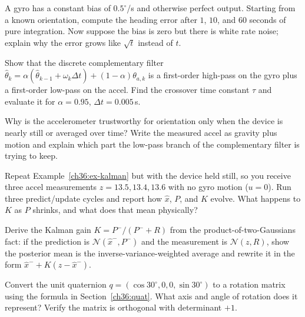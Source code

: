 \begin{exercise}
A gyro has a constant bias of $0.5^\circ$/s and otherwise perfect output. Starting from a
known orientation, compute the heading error after $1$, $10$, and $60$ seconds of pure
integration. Now suppose the bias is zero but there is white rate noise; explain why the
error grows like $\sqrt{t}$ instead of $t$.
\end{exercise}

\begin{exercise}
Show that the discrete complementary filter
$\hat\theta_k = \alpha(\hat\theta_{k-1}+\omega_k\Delta t) + (1-\alpha)\theta_{a,k}$ is a
first-order high-pass on the gyro plus a first-order low-pass on the accel. Find the
crossover time constant $\tau$ and evaluate it for $\alpha=0.95$, $\Delta t=0.005$\,s.
\end{exercise}

\begin{exercise}
Why is the accelerometer trustworthy for orientation only when the device is nearly
still or averaged over time? Write the measured accel as gravity plus motion and explain
which part the low-pass branch of the complementary filter is trying to keep.
\end{exercise}

\begin{exercise}
Repeat Example~\ref{ch36:ex-kalman} but with the device held still, so you receive three
accel measurements $z = 13.5, 13.4, 13.6$ with no gyro motion ($u=0$). Run three
predict/update cycles and report how $\hat x$, $P$, and $K$ evolve. What happens to $K$
as $P$ shrinks, and what does that mean physically?
\end{exercise}

\begin{exercise}
Derive the Kalman gain $K=P^-/(P^-+R)$ from the product-of-two-Gaussians fact: if the
prediction is $\mathcal N(\hat x^-, P^-)$ and the measurement is $\mathcal N(z,R)$, show
the posterior mean is the inverse-variance-weighted average and rewrite it in the form
$\hat x^- + K(z-\hat x^-)$.
\end{exercise}

\begin{exercise}
Convert the unit quaternion $q=(\cos 30^\circ, 0, 0, \sin 30^\circ)$ to a rotation
matrix using the formula in Section~\ref{ch36:quat}. What axis and angle of rotation does
it represent? Verify the matrix is orthogonal with determinant $+1$.
\end{exercise}

